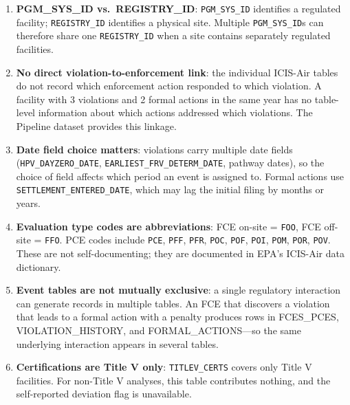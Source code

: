 \documentclass[11pt]{article}
\begin{document}
\begin{enumerate}[nosep]
  \item \textbf{PGM\_SYS\_ID vs.\ REGISTRY\_ID}: \texttt{PGM\_SYS\_ID} identifies a regulated facility; \texttt{REGISTRY\_ID} identifies a physical site. Multiple \texttt{PGM\_SYS\_ID}s can therefore share one \texttt{REGISTRY\_ID} when a site contains separately regulated facilities.

  \item \textbf{No direct violation-to-enforcement link}: the individual ICIS-Air tables do not record which enforcement action responded to which violation. A facility with 3 violations and 2 formal actions in the same year has no table-level information about which actions addressed which violations. The Pipeline dataset provides this linkage.

  \item \textbf{Date field choice matters}: violations carry multiple date fields (\texttt{HPV\_DAYZERO\_DATE}, \texttt{EARLIEST\_FRV\_DETERM\_DATE}, pathway dates), so the choice of field affects which period an event is assigned to. Formal actions use \texttt{SETTLEMENT\_ENTERED\_DATE}, which may lag the initial filing by months or years.

  \item \textbf{Evaluation type codes are abbreviations}: FCE on-site = \texttt{FOO}, FCE off-site = \texttt{FFO}. PCE codes include \texttt{PCE}, \texttt{PFF}, \texttt{PFR}, \texttt{POC}, \texttt{POF}, \texttt{POI}, \texttt{POM}, \texttt{POR}, \texttt{POV}. These are not self-documenting; they are documented in EPA's ICIS-Air data dictionary.

  \item \textbf{Event tables are not mutually exclusive}: a single regulatory interaction can generate records in multiple tables. An FCE that discovers a violation that leads to a formal action with a penalty produces rows in FCES\_PCES, VIOLATION\_HISTORY, and FORMAL\_ACTIONS---so the same underlying interaction appears in several tables.

  \item \textbf{Certifications are Title V only}: \texttt{TITLEV\_CERTS} covers only Title V facilities. For non-Title V analyses, this table contributes nothing, and the self-reported deviation flag is unavailable.
\end{enumerate}
\end{document}
